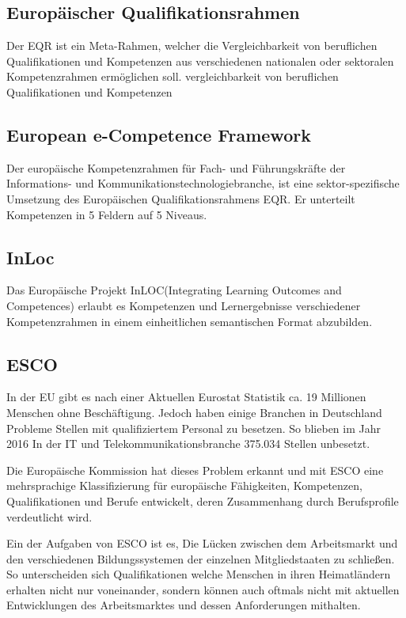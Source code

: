 \vspace{1em}
\subsection{Europäischer Qualifikationsrahmen}
Der EQR ist ein Meta-Rahmen, welcher die Vergleichbarkeit von beruflichen Qualifikationen und Kompetenzen aus verschiedenen nationalen oder sektoralen Kompetenzrahmen ermöglichen soll. 
vergleichbarkeit von beruflichen Qualifikationen und Kompetenzen
\subsection{European e-Competence Framework}\label{e-CF}

Der europäische Kompetenzrahmen für Fach- und Führungskräfte der Informations- und Kommunikationstechnologiebranche, ist eine sektor-spezifische Umsetzung des Europäischen Qualifikationsrahmens EQR. Er unterteilt Kompetenzen in 5 Feldern auf 5 Niveaus. 
\subsection{InLoc}\label{inloc}

Das Europäische Projekt InLOC(Integrating Learning Outcomes and Competences) erlaubt es Kompetenzen und Lernergebnisse verschiedener Kompetenzrahmen in einem einheitlichen semantischen Format abzubilden. 



\subsection{ESCO}

In der EU gibt es nach einer Aktuellen Eurostat Statistik ca. 19 Millionen Menschen ohne Beschäftigung. Jedoch haben einige Branchen in Deutschland Probleme Stellen mit qualifiziertem Personal zu besetzen. So blieben im Jahr 2016 In der IT und Telekommunikationsbranche 375.034 Stellen unbesetzt.\cite{Statista2016}
 
Die Europäische Kommission hat dieses Problem erkannt und mit ESCO eine mehrsprachige Klassifizierung für europäische Fähigkeiten, Kompetenzen, Qualifikationen und Berufe entwickelt, deren Zusammenhang durch Berufsprofile verdeutlicht wird.
 
Ein der Aufgaben von ESCO ist es, Die Lücken zwischen dem Arbeitsmarkt und den verschiedenen Bildungssystemen der einzelnen Mitgliedstaaten zu schließen. So unterscheiden sich Qualifikationen welche Menschen in ihren Heimatländern erhalten nicht nur voneinander, sondern können auch oftmals nicht mit aktuellen Entwicklungen des Arbeitsmarktes und dessen Anforderungen mithalten.

